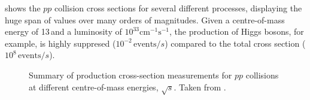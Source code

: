  shows the $pp$ collision cross sections for several different processes, displaying the huge span of values over many orders of magnitudes. 
Given a centre-of-mass energy of 13\,\TeV and a luminosity of $10^{33}\mathrm{cm^{-1}s^{-1}}$, the production of Higgs bosons, for example, is highly suppresed ($10^{-2}\,\text{events}/s$) compared to the total cross section ($10^8\,\text{events}/s$).

\begin{figure}
  \caption[Summary of production cross-sections measurements for $pp$ collisions at different centre-of-mass energy, $\sqrt{s}$.]{
    Summary of production cross-section measurements for $pp$ collisions at different centre-of-mass energies, $\sqrt{s}$. Taken from .
    }
  \label{fig:xsec}
\end{figure}


